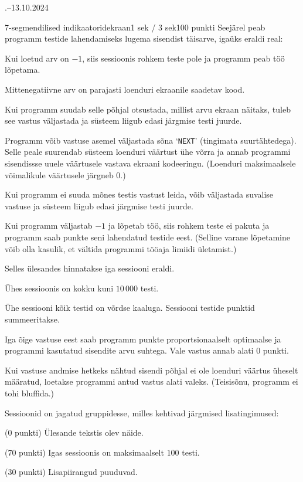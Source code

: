 \documentclass[a4paper,11pt]{article}
\begin{document}
\begin{ol}{\eio}{.--13.10.2024}{\yle}{}
\begin{yl}{6}{7-segmendilised indikaatorid}{ekraan}{1 sek / 3 sek}{100 punkti}
Seejärel peab programm testide lahendamiseks lugema sisendist täisarve, igaüks eraldi real:
\begin{xitem}
\item Kui loetud arv on $-1$, siis sessioonis rohkem teste pole ja programm peab töö lõpetama.
\item Mittenegatiivne arv on parajasti loenduri ekraanile saadetav kood.
\item Kui programm suudab selle põhjal otsustada, millist arvu ekraan näitaks, tuleb see vastus väljastada ja süsteem liigub edasi järgmise testi juurde.
\item Programm võib vastuse asemel väljastada sõna `\verb/NEXT/' (tingimata suurtähtedega). Selle peale suurendab süsteem loenduri väärtust ühe võrra ja annab programmi sisendissse uuele väärtusele vastava ekraani kodeeringu. (Loenduri maksimaalsele võimalikule väärtusele järgneb $0$.)
\item Kui programm ei suuda mõnes testis vastust leida, võib väljastada suvalise vastuse ja süsteem liigub edasi järgmise testi juurde.
\item Kui programm väljastab $-1$ ja lõpetab töö, siis rohkem teste ei pakuta ja programm saab punkte seni lahendatud testide eest. (Selline varane lõpetamine võib olla kasulik, et vältida programmi tööaja limiidi ületamist.)
\end{xitem}

\hnd Selles ülesandes hinnatakse iga sessiooni eraldi.
\begin{xitem}
\item Ühes sessioonis on kokku kuni $10\,000$ testi.
\item Ühe sessiooni kõik testid on võrdse kaaluga. Sessiooni testide punktid summeeritakse.
\item Iga õige vastuse eest saab programm punkte proportsionaalselt optimaalse ja programmi kasutatud sisendite arvu suhtega. Vale vastus annab alati $0$ punkti.
\item Kui vastuse andmise hetkeks nähtud sisendi põhjal ei ole loenduri väärtus üheselt määratud, loetakse programmi antud vastus alati valeks. (Teisisõnu, programm ei tohi bluffida.)
\end{xitem}

Sessioonid on jagatud gruppidesse, milles kehtivad järgmised lisatingimused:
\begin{xenum}
  \item (0 punkti) Ülesande tekstis olev näide.
  \item (70 punkti) Igas sessioonis on maksimaalselt $100$ testi.
  \item (30 punkti) Lisapiirangud puuduvad.
\end{xenum}


\end{yl}
\end{ol}
\end{document}
